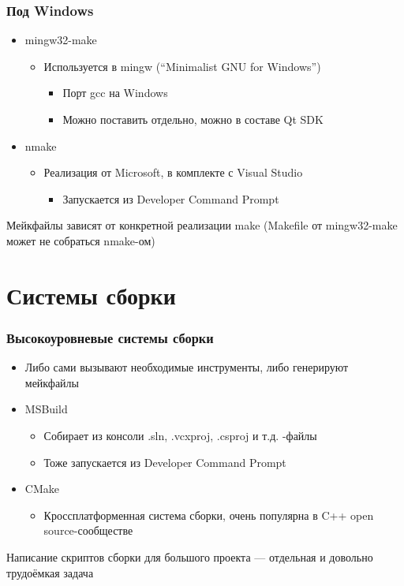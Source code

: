 \documentclass{../../slides-style}
\begin{document}
    \begin{frame}
        \frametitle{Под Windows}
        \begin{itemize}
            \item mingw32-make
            \begin{itemize}
                \item Используется в mingw (``Minimalist GNU for Windows'')
                \begin{itemize}
                    \item Порт gcc на Windows
                    \item Можно поставить отдельно, можно в составе Qt SDK
                \end{itemize}
            \end{itemize}
            \item nmake
            \begin{itemize}
                \item Реализация от Microsoft, в комплекте с Visual Studio
                \begin{itemize}
                    \item Запускается из Developer Command Prompt
                \end{itemize}
            \end{itemize}
        \end{itemize}
        Мейкфайлы зависят от конкретной реализации make (Makefile от mingw32-make может не собраться nmake-ом)
    \end{frame}

    \section{Системы сборки}

    \begin{frame}
        \frametitle{Высокоуровневые системы сборки}
        \begin{itemize}
            \item Либо сами вызывают необходимые инструменты, либо генерируют мейкфайлы
            \item MSBuild
            \begin{itemize}
                \item Собирает из консоли .sln, .vcxproj, .csproj и т.д. -файлы
                \item Тоже запускается из Developer Command Prompt
            \end{itemize}
            \item CMake
            \begin{itemize}
                \item Кроссплатформенная система сборки, очень популярна в C++ open source-сообществе
            \end{itemize}
        \end{itemize}
        Написание скриптов сборки для большого проекта --- отдельная и довольно трудоёмкая задача
    \end{frame}
\end{document}
